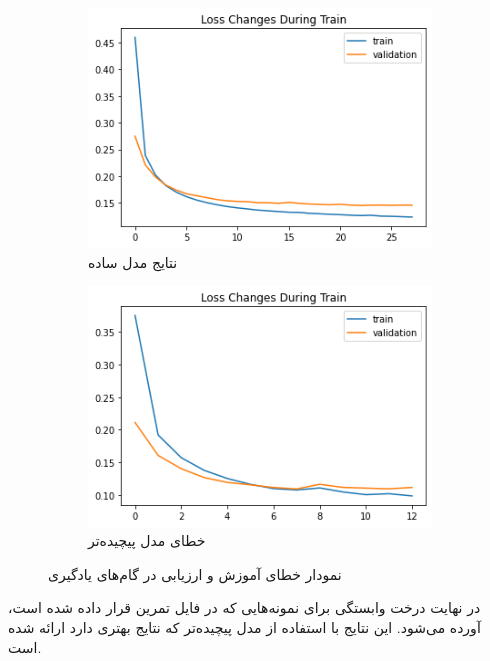 \documentclass[12pt, a4paper]{article}
\begin{document}
\begin{figure}[h]
    \centering
    \begin{subfigure}{0.45\linewidth}
        \centering
        \includegraphics[width=0.8\linewidth]{images/loss1.png}
        \caption{نتایج مدل ساده}
    \end{subfigure}
    \begin{subfigure}{0.45\linewidth}
        \centering
        \includegraphics[width=0.8\linewidth]{images/loss2.png}
        \caption{خطای مدل پیچیده‌تر}
    \end{subfigure}
    \caption{نمودار خطای آموزش و ارزیابی در گام‌های یادگیری}
\end{figure}

در نهایت درخت وابستگی برای نمونه‌هایی که در فایل تمرین قرار داده شده است، آورده می‌شود.
این نتایج با استفاده از مدل پیچیده‌تر که نتایج بهتری دارد ارائه شده است.

\clearpage
\end{document}

